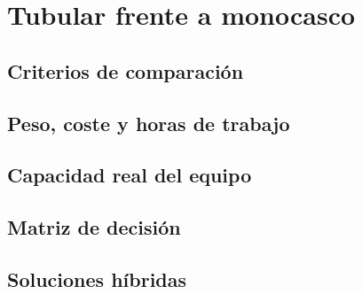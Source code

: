 \chapter{Tubular frente a monocasco}
\label{ch:tubular_vs_monocasco}

\begin{objetivos}
  \item {}
  \item {}
  \item {}
\end{objetivos}


\section{Criterios de comparación}
\label{sec:tubular_vs_monocasco:01}

\section{Peso, coste y horas de trabajo}
\label{sec:tubular_vs_monocasco:02}

\section{Capacidad real del equipo}
\label{sec:tubular_vs_monocasco:03}

\section{Matriz de decisión}
\label{sec:tubular_vs_monocasco:04}

\section{Soluciones híbridas}
\label{sec:tubular_vs_monocasco:05}


